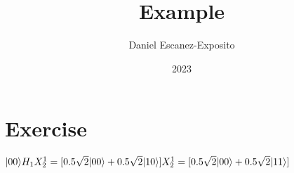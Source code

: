 \documentclass{article}
\title{Example}
\author{Daniel Escanez-Exposito}
\date{2023}
\begin{document}
    \maketitle

    \section{Exercise}
    $
     |00\rangle H_{1}X_{2}^{1}\\ \\ 
= [0.5 \sqrt{2} |00\rangle +0.5 \sqrt{2} |10\rangle ]X_{2}^{1}\\ \\ 
= [0.5 \sqrt{2} |00\rangle +0.5 \sqrt{2} |11\rangle ]\\ 
    $
    
\end{document}
